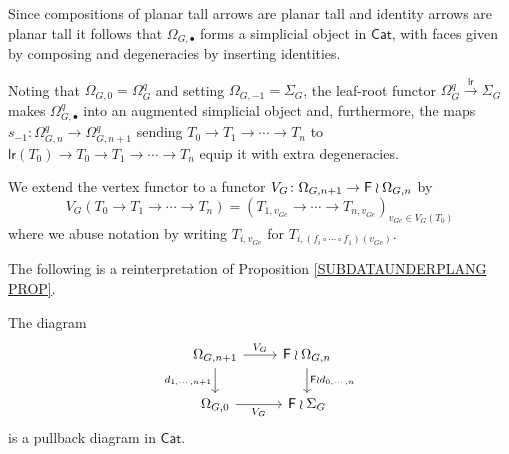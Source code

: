 \documentclass[a4paper,10pt]{article}%
\begin{document}
\begin{notation}\label{SIMPOPERATORS NOT}
  Since compositions of planar tall arrows are planar tall
  and identity arrows are planar tall	
  it follows that 
  $\Omega_{G,\bullet}$
  forms a simplicial object in $\mathsf{Cat}$, 
  with faces given by composing and degeneracies by inserting identities. 

  Noting that $\Omega_{G,0} = \Omega_G^q$ and setting 
  $\Omega_{G,-1} = \Sigma_G$, the leaf-root functor $\Omega_G^q \xrightarrow{\mathsf{lr}} \Sigma_G$ makes 
  $\Omega_{G,\bullet}^q$ into an augmented simplicial object and, furthermore, the maps 
  $s_{-1} \colon \Omega_{G,n}^q \to \Omega_{G,n+1}^q$
  sending $T_0 \to T_1 \to \cdots \to T_n$ to 
  $\mathsf{lr}(T_0) \to T_0 \to T_1 \to \cdots \to T_n$ equip it with extra degeneracies.
\end{notation}


\begin{notation}
  We extend the vertex functor to a functor 
  $V_G \colon \Omega_{G,n+1} \to \mathsf{F} \wr \Omega_{G,n}$
  by
  \begin{equation}\label{VGDEF EQ}
    V_G(T_0 \to T_1 \to \cdots \to T_n) = 
    (T_{1,v_{Ge}} \to \cdots \to
    T_{n,v_{Ge}})_{v_{Ge} \in V_G(T_0)}	
  \end{equation}
  where we abuse notation by writing $T_{i,v_{Ge}}$
  for $T_{i, (f_i\circ \cdots \circ f_1)(v_{Ge})}$.
\end{notation}


The following is a reinterpretation of Proposition \ref{SUBDATAUNDERPLANG PROP}.

\begin{proposition} \label{SUBSASPULL PROP}
  The diagram
  \begin{equation}\label{PTPULL EQ}
    \begin{tikzcd}
      \Omega_{G,n+1} \ar{r}{V_G} 
      \ar{d}[swap]{d_{1,\cdots,n+1}} & \Fin \wr \Omega_{G,n} 
      \ar{d}{\Fin \wr d_{0,\cdots,n}}
      \\
      \Omega_{G,0} \ar{r}[swap]{V_G} & \Fin \wr \Sigma_G
    \end{tikzcd}
  \end{equation}
  is a pullback diagram in $\mathsf{Cat}$.
\end{proposition}
\end{document}
